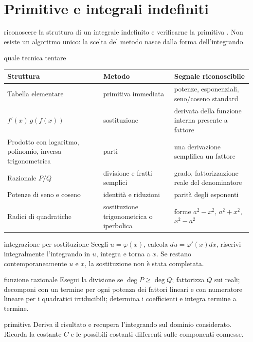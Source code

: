 \chapter{Primitive e integrali indefiniti}
\label{chap:14}

\begin{obiettivocapitolo}{riconoscere la struttura di un integrale indefinito e verificarne la primitiva}
\prioritaalta. Non esiste un algoritmo unico: la scelta del metodo nasce dalla forma dell'integrando.
\end{obiettivocapitolo}
\begin{sceltametodo}{quale tecnica tentare}
\begin{longtable}{@{}p{}p{}p{}@{}}
\toprule
\textbf{Struttura} & \textbf{Metodo} & \textbf{Segnale riconoscibile}\\
\midrule\endhead
Tabella elementare & primitiva immediata & potenze, esponenziali, seno/coseno standard\\
$f'(x)\,g(f(x))$ & sostituzione & derivata della funzione interna presente a fattore\\
Prodotto con logaritmo, polinomio, inversa trigonometrica & parti & una derivazione semplifica un fattore\\
Razionale $P/Q$ & divisione e fratti semplici & grado, fattorizzazione reale del denominatore\\
Potenze di seno e coseno & identità e riduzioni & parità degli esponenti\\
Radici di quadratiche & sostituzione trigonometrica o iperbolica & forme $a^2-x^2$, $a^2+x^2$, $x^2-a^2$\\
\bottomrule
\end{longtable}
\end{sceltametodo}
\begin{proceduraesame}{integrazione per sostituzione}
Scegli $u=\varphi(x)$, calcola $du=\varphi'(x)dx$, riscrivi integralmente l'integrando in $u$, integra e torna a $x$. Se restano contemporaneamente $u$ e $x$, la sostituzione non è stata completata.
\end{proceduraesame}
\begin{proceduraesame}{funzione razionale}
Esegui la divisione se $\deg P\ge\deg Q$; fattorizza $Q$ sui reali; decomponi con un termine per ogni potenza dei fattori lineari e con numeratore lineare per i quadratici irriducibili; determina i coefficienti e integra termine a termine.
\end{proceduraesame}
\begin{controllofinale}{primitiva}
Deriva il risultato e recupera l'integrando sul dominio considerato. Ricorda la costante $C$ e le possibili costanti differenti sulle componenti connesse.
\end{controllofinale}

